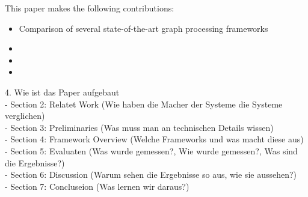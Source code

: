 This paper makes the following contributions:
\begin{itemize}
  \item Comparison of several state-of-the-art graph processing frameworks
  \item
  \item
  \item
\end{itemize}


4. Wie ist das Paper aufgebaut\\
- Section 2: Relatet Work (Wie haben die Macher der Systeme die Systeme verglichen)\\
- Section 3: Preliminaries (Was muss man an technischen Details wissen)\\
- Section 4: Framework Overview (Welche Frameworks und was macht diese aus)\\
- Section 5: Evaluaten (Was wurde gemessen?, Wie wurde gemessen?, Was sind die Ergebnisse?)\\
- Section 6: Discussion (Warum sehen die Ergebnisse so aus, wie sie aussehen?)\\
- Section 7: Concluseion (Was lernen wir daraus?)\\
